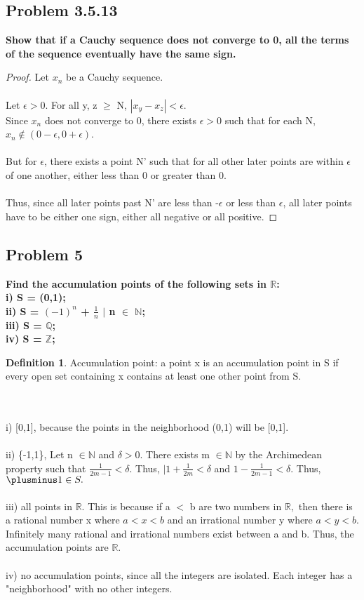 \documentclass[12pt]{article}
\theoremstyle{definition}
\newtheorem{definition}[theorem]{Definition}
\numberwithin{equation}{subsection}
\begin{document}
\subsection{Problem 3.5.13}
\textbf{Show that if a Cauchy sequence does not converge to 0, all the terms of the sequence eventually have the same sign.}
\begin{proof}
Let $x_{n}$ be a Cauchy sequence. 
\\\\Let $\epsilon > 0$. For all y, z $\geq$ N, $|x_{y} - x_{z}| < \epsilon$.
\\Since $x_{n}$ does not converge to 0, there exists $\epsilon > 0$ such that for each N,
$x_{n} \notin (0-\epsilon, 0+\epsilon)$.
\\\\
But for $\epsilon$, there exists a point N' such that for all other later points are within $\epsilon$ of one another, either less than 0 or greater than 0.
\\\\
Thus, since all later points past N' are less than -$\epsilon$ or less than $\epsilon$, all later points have to be either one sign, either all negative or all positive.
\end{proof}

\subsection{Problem 5}
\textbf{Find the accumulation points of the following sets in $\mathbb{R}$:
\\ i) S = (0,1);
\\ ii) S = {$(-1)^{n}$ + $\frac{1}{n}$ $|$ n $\in$ $\mathbb{N}$};
\\ iii) S = $\mathbb{Q}$;
\\ iv) S = $\mathbb{Z}$;
}
\begin{definition}
Accumulation point: a point x is an accumulation point in S if every open set containing x contains at least one other point from S. 
\end{definition}
\\
\\ i) [0,1], because the points in the neighborhood (0,1) will be [0,1].
\\\\ ii) \{-1,1\}, Let n $\in \mathbb{N}$ and $\delta > 0.$ There exists m $\in \mathbb{N}$ by the Archimedean property such that $\frac{1}{2m-1} < \delta$. Thus, $|1+\frac{1}{2m}<\delta$ and $1-\frac{1}{2m-1}<\delta$. Thus, $\plusminus 1 \in S.$ 
\\\\ iii) all points in $\mathbb{R}$. This is because if a $<$ b are two numbers in $\mathbb{R},$ then there is a rational number x where $a < x < b$ and an irrational number y where $a<y<b$. Infinitely many rational and irrational numbers exist between a and b. Thus, the accumulation points are $\mathbb{R}.$\\
\\ iv) no accumulation points, since all the integers are isolated. Each integer has a "neighborhood" with no other integers.
\end{document}
